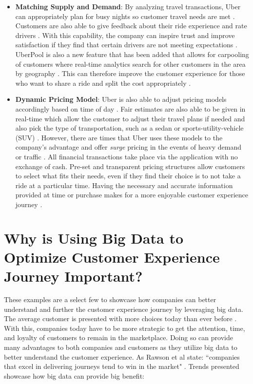 \documentclass[sigconf]{acmart}
\begin{document}
\begin{itemize}
 \item \textbf{Matching Supply and Demand}: By analyzing travel transactions, Uber can appropriately plan for busy nights so customer travel needs are met \cite{Cohen2016}. Customers are also able to give feedback about their ride experience and rate drivers \cite{Central2017}. With this capability, the company can inspire trust and improve satisfaction if they find that certain drivers are not meeting expectations \cite{Central2017}. UberPool is also a new feature that has been added that allows for carpooling of customers where real-time analytics search for other customers in the area by geography \cite{Central2017}. This can therefore improve the customer experience for those who want to share a ride and split the cost appropriately \cite{Central2017}. 
 \item \textbf{Dynamic Pricing Model}: Uber is also able to adjust pricing models accordingly based on time of day \cite{Cohen2016}. Fair estimates are also able to be given in real-time which allow the customer to adjust their travel plans if needed and also pick the type of transportation, such as a sedan or sports-utility-vehicle (SUV) \cite{Cohen2016}. However, there are times that Uber uses these models to the company's advantage and offer \textit{surge} pricing in the events of heavy demand or traffic \cite{Cohen2016}. All financial transactions take place via the application with no exchange of cash. Pre-set and transparent pricing structures allow customers to select what fits their needs, even if they find their choice is to not take a ride at a particular time. Having the necessary and accurate information provided at time or purchase makes for a more enjoyable customer experience journey \cite{Central2017}.  
\end{itemize}

\section{Why is Using Big Data to Optimize Customer Experience Journey Important?}
These examples are a select few to showcase how companies can better understand and further the customer experience journey by leveraging big data. The average customer is presented with more choices today than ever before \cite{Meyer2007}. With this, companies today have to be more strategic to get the attention, time, and loyalty of customers to remain in the marketplace. Doing so can provide many advantages to both companies and customers as they utilize big data to better understand the customer experience. As Rawson et al state: ``companies that excel in delivering journeys tend to win in the market" \cite{Rawson2013}. Trends presented showcase how big data can provide big benefit:
\end{document}
